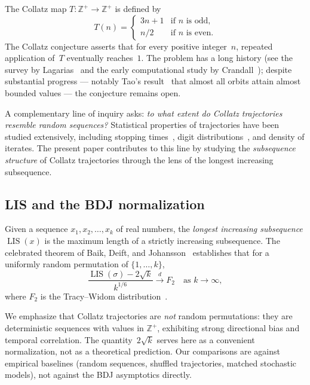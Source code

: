 \documentclass[11pt]{article}
\theoremstyle{definition}
\theoremstyle{remark}
\newcommand{\LIS}{\operatorname{LIS}}
\begin{document}
The Collatz map $T \colon \mathbb{Z}^+ \to \mathbb{Z}^+$ is defined by
\begin{equation}\label{eq:collatz}
  T(n) = \begin{cases} 3n+1 & \text{if } n \text{ is odd},\\
                        n/2  & \text{if } n \text{ is even}. \end{cases}
\end{equation}
The Collatz conjecture asserts that for every positive integer~$n$, repeated
application of~$T$ eventually reaches~$1$. The problem has a long history
(see the survey by Lagarias~\cite{Lagarias1985} and the early computational
study by Crandall~\cite{Crandall1978}); despite substantial progress ---
notably Tao's result~\cite{Tao2019} that almost all orbits attain almost
bounded values --- the conjecture remains open.

A complementary line of inquiry asks: \emph{to what extent do Collatz
trajectories resemble random sequences?} Statistical properties of
trajectories have been studied extensively, including stopping
times~\cite{Terras1976}, digit distributions~\cite{KontorovichMiller2005},
and density of iterates. The present paper contributes to this line by
studying the \emph{subsequence structure} of Collatz trajectories through
the lens of the longest increasing subsequence.

\subsection{LIS and the BDJ normalization}

Given a sequence $x_1, x_2, \ldots, x_k$ of real numbers, the
\emph{longest increasing subsequence} $\LIS(x)$ is the maximum length of
a strictly increasing subsequence. The celebrated theorem of Baik, Deift,
and Johansson~\cite{BDJ1999} establishes that for a uniformly random
permutation of $\{1, \ldots, k\}$,
\begin{equation}\label{eq:bdj}
  \frac{\LIS(\sigma) - 2\sqrt{k}}{k^{1/6}} \xrightarrow{d}
    F_2 \quad \text{as } k \to \infty,
\end{equation}
where $F_2$ is the Tracy--Widom distribution~\cite{TracyWidom1994}.

We emphasize that Collatz trajectories are \emph{not} random permutations:
they are deterministic sequences with values in $\mathbb{Z}^+$, exhibiting
strong directional bias and temporal correlation. The
quantity~$2\sqrt{k}$ serves here as a convenient normalization, not as a
theoretical prediction. Our comparisons are against empirical baselines
(random sequences, shuffled trajectories, matched stochastic models), not
against the BDJ asymptotics directly.
\end{document}
